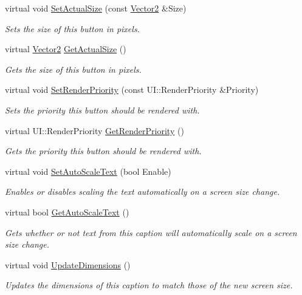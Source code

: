 \begin{DoxyCompactItemize}
virtual void \hyperlink{classphys_1_1UI_1_1TextButton_a768d203a323cca2054fa355c25fab9ef}{SetActualSize} (const \hyperlink{classphys_1_1Vector2}{Vector2} \&Size)
\begin{DoxyCompactList}\small\item\em Sets the size of this button in pixels. \item\end{DoxyCompactList}\item 
virtual \hyperlink{classphys_1_1Vector2}{Vector2} \hyperlink{classphys_1_1UI_1_1TextButton_a062b31c199f875d4f825f6be1d11fb55}{GetActualSize} ()
\begin{DoxyCompactList}\small\item\em Gets the size of this button in pixels. \item\end{DoxyCompactList}\item 
virtual void \hyperlink{classphys_1_1UI_1_1TextButton_a60b433a61f163f275e3fd834d74d9092}{SetRenderPriority} (const UI::RenderPriority \&Priority)
\begin{DoxyCompactList}\small\item\em Sets the priority this button should be rendered with. \item\end{DoxyCompactList}\item 
virtual UI::RenderPriority \hyperlink{classphys_1_1UI_1_1TextButton_ad339621af6e73ff9702c0dd4cdadbb73}{GetRenderPriority} ()
\begin{DoxyCompactList}\small\item\em Gets the priority this button should be rendered with. \item\end{DoxyCompactList}\item 
virtual void \hyperlink{classphys_1_1UI_1_1TextButton_afa1fd7dea37485b0b364328e62154a4f}{SetAutoScaleText} (bool Enable)
\begin{DoxyCompactList}\small\item\em Enables or disables scaling the text automatically on a screen size change. \item\end{DoxyCompactList}\item 
virtual bool \hyperlink{classphys_1_1UI_1_1TextButton_a0fed05cef1c311aa1b08c8f1a6830988}{GetAutoScaleText} ()
\begin{DoxyCompactList}\small\item\em Gets whether or not text from this caption will automatically scale on a screen size change. \item\end{DoxyCompactList}\item 
virtual void \hyperlink{classphys_1_1UI_1_1TextButton_a5099be328baf55b9925227d11128c328}{UpdateDimensions} ()
\begin{DoxyCompactList}\small\item\em Updates the dimensions of this caption to match those of the new screen size. \item\end{DoxyCompactList}\end{DoxyCompactItemize}
